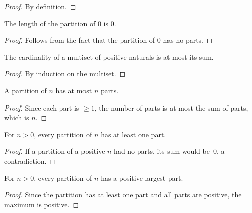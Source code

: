 \begin{proof}
\leanok
By definition.
\end{proof}

\begin{lemma}
\label{lem.pars.parts-card-zero}
\leanhelper
\leanok
The length of the partition of $0$ is $0$.
\end{lemma}

\begin{proof}
\leanok
Follows from the fact that the partition of $0$ has no parts.
\end{proof}

\begin{lemma}
\label{lem.pars.card-le-sum-of-pos}
\leanhelper
\leanok
The cardinality of a multiset of positive naturals is at most its sum.
\end{lemma}

\begin{proof}
\leanok
By induction on the multiset.
\end{proof}

\begin{lemma}
\label{lem.pars.numParts-le}
\leanhelper
\leanok
A partition of $n$ has at most $n$ parts.
\end{lemma}

\begin{proof}
\leanok
Since each part is $\geq 1$, the number of parts is at most the sum of parts, which is $n$.
\end{proof}

\begin{lemma}
\label{lem.pars.numParts-pos}
\leanhelper
\leanok
For $n>0$, every partition of $n$ has at least one part.
\end{lemma}

\begin{proof}
\leanok
If a partition of a positive $n$ had no parts, its sum would be~$0$, a contradiction.
\end{proof}

\begin{lemma}
\label{lem.pars.largestPart-pos}
\leanhelper
\leanok
For $n>0$, every partition of $n$ has a positive largest part.
\end{lemma}

\begin{proof}
\leanok
Since the partition has at least one part and all parts are positive, the maximum is positive.
\end{proof}


